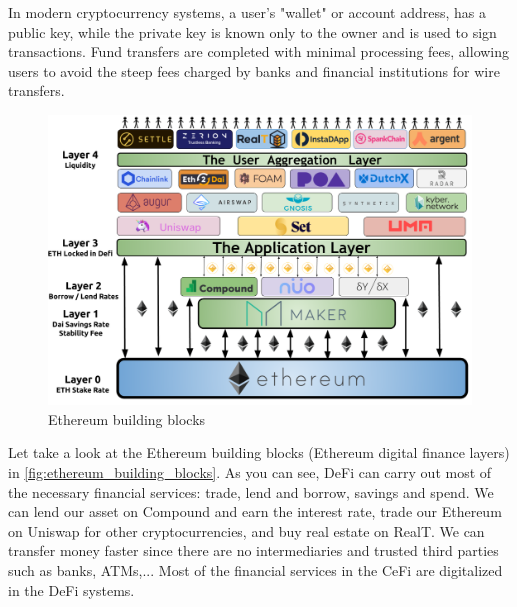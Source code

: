 In modern cryptocurrency systems, a user's "wallet" or account address, has a public key, while the private key is known only to the owner and is used to sign transactions. Fund transfers are completed with minimal processing fees, allowing users to avoid the steep fees charged by banks and financial institutions for wire transfers.




\begin{figure}[h]
  \centering
  \includegraphics[width=.70\textwidth]{images/ethereum_building_blocks.png}
  \caption[Ethereum building blocks]{Ethereum building blocks}
  \label{fig:ethereum_building_blocks}
\end{figure}

Let take a look at the Ethereum building blocks (Ethereum digital finance layers) in \autoref{fig:ethereum_building_blocks}. As you can see, DeFi can carry out most of the necessary financial services: trade, lend and borrow, savings and spend. We can lend our asset on Compound and earn the interest rate, trade our Ethereum on Uniswap for other cryptocurrencies, and buy real estate on RealT. We can transfer money faster since there are no intermediaries and trusted third parties such as banks, ATMs,... Most of the financial services in the CeFi are digitalized in the DeFi systems.


